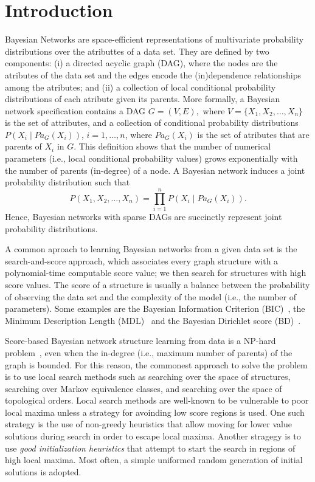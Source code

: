 \section{Introduction}
\label{sec:introduction}

Bayesian Networks are space-efficient representations of multivariate
probability distributions over the atributtes of a data set. They are
defined by two components: (i) a directed acyclic graph (DAG), where the
nodes are the atributes of the data set and the edges encode the
(in)dependence relationships among the atributes; and (ii) a collection
of local conditional probability distributions of each atribute given
its parents. More formally, a Bayesian network specification contains a
DAG \( G = ( V , E ), \) where $V = \{ X_1 , X_2 , \ldots , X_n \}$ is
the set of attributes, and a collection of conditional probability
distributions \( P( X_i \mid {Pa}_G( X_i ) ) \), $i=1,\ldots,n$, where
${Pa}_G( X_i )$ is the set of atributes that are parents of $X_i$ in
$G$. This definition shows that the number of numerical parameters
(i.e., local conditional probability values) grows exponentially with
the number of parents (in-degree) of a node. A Bayesian network induces
a joint probability distribution such that
\[ P( X_1 , X_2 , \ldots , X_n ) = \prod_{i=1}^{n} P( X_i \mid {Pa}_G( X_i ) ).  \]
Hence, Bayesian networks with sparse DAGs are succinctly represent joint
probability distributions.

A common aproach to learning Bayesian networks from a given data set is
the search-and-score approach, which associates every graph structure
with a polynomial-time computable \alert{score} value; we then search
for structures with high score values. The score of a structure is
usually a balance between the probability of observing the data set and
the complexity of the model (i.e., the number of parameters). Some
examples are the Bayesian Information Criterion (BIC)~\cite{BIC91}, the
Minimum Description Length (MDL)~\cite{MDL94} and the Bayesian Dirichlet
score (BD)~\cite{BD95}.


Score-based Bayesian network structure learning from data is a NP-hard
problem~\cite{MSResearch04}, even when the in-degree (i.e., maximum
number of parents) of the graph is bounded. For this reason, the
commonest approach to solve the problem is to use local search methods
such as searching over the space of structures, searching over Markov
equivalence classes, and searching over the space of topological
orders. Local search methods are well-known to be vulnerable to poor
local maxima unless a strategy for avoinding low score regions is
used. One such strategy is the use of non-greedy heuristics that allow
moving for lower value solutions during search in order to escape local
maxima. Another stragegy is to use \emph{good initialization heuristics}
that attempt to start the search in regions of high local maxima. Most
often, a simple uniformed random generation of initial solutions is
adopted.

